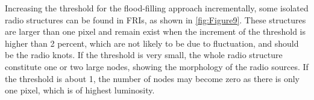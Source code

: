 \documentclass{aa}
\begin{document}

Increasing the threshold for the flood-filling approach incrementally, some isolated radio structures can be found in FRIs, as shown in \autoref{fig:Figure9}.
These structures are larger than one pixel and remain exist when the increment of the threshold is higher than 2 percent, which are not likely to be due to fluctuation, and should be the radio knots. If the threshold is very small, the whole radio structure constitute one or two large nodes, showing the morphology of the radio sources. 
If the threshold is about 1, the number of nodes may become zero as there is only one pixel, which is of highest luminosity.
\end{document}
